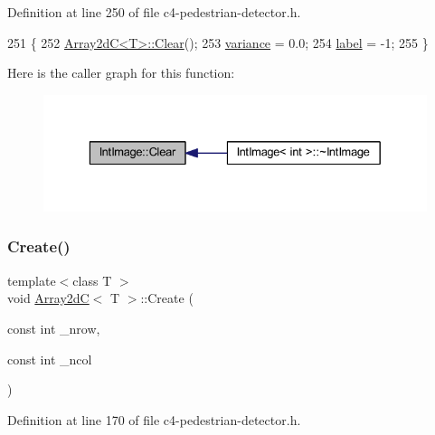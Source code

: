 Definition at line 250 of file c4-\/pedestrian-\/detector.\+h.


\begin{DoxyCode}
251 \{
252     \mbox{\hyperlink{class_array2d_c_a76a406cfeb9a9f75a1586e0a7b22f63e}{Array2dC<T>::Clear}}();
253     \mbox{\hyperlink{class_int_image_a2da0267dc732e9e4149e70a05f744fb6}{variance}} = 0.0;
254     \mbox{\hyperlink{class_int_image_aeeeaa5da82f21cdc95ab3f941aa405e7}{label}} = -1;
255 \}
\end{DoxyCode}
Here is the caller graph for this function\+:\nopagebreak
\begin{figure}[H]
\begin{center}
\leavevmode
\includegraphics[width=329pt]{class_int_image_a183a2bb5b576ab7a03010c0fff8f47cb_icgraph}
\end{center}
\end{figure}
\mbox{\label{class_array2d_c_abfe87be7641dfc586b9e7bffebcca9ec}} 
\subsubsection{\texorpdfstring{Create()}{Create()}}
{\footnotesize\ttfamily template$<$class T $>$ \\
void \mbox{\hyperlink{class_array2d_c}{Array2dC}}$<$ T $>$\+::Create (\begin{DoxyParamCaption}\item[{const int}]{\+\_\+nrow,  }\item[{const int}]{\+\_\+ncol }\end{DoxyParamCaption})\hspace{0.3cm}{\ttfamily [inherited]}}



Definition at line 170 of file c4-\/pedestrian-\/detector.\+h.



